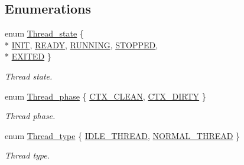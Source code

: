 \subsection*{Enumerations}
\begin{DoxyCompactItemize}
\item 
enum \hyperlink{group__scheduler_ga6c969c169777f82c104cf73e501df70f}{Thread\-\_\-state} \{ \\*
\hyperlink{group__scheduler_gga6c969c169777f82c104cf73e501df70fa0cb1b2c6a7db1f1084886c98909a3f36}{I\-N\-I\-T}, 
\hyperlink{group__scheduler_gga6c969c169777f82c104cf73e501df70fa6564f2f3e15be06b670547bbcaaf0798}{R\-E\-A\-D\-Y}, 
\hyperlink{group__scheduler_gga6c969c169777f82c104cf73e501df70fa1061be6c3fb88d32829cba6f6b2be304}{R\-U\-N\-N\-I\-N\-G}, 
\hyperlink{group__scheduler_gga6c969c169777f82c104cf73e501df70fa948b2aee15f52b421fa4770c47bcfe8c}{S\-T\-O\-P\-P\-E\-D}, 
\\*
\hyperlink{group__scheduler_gga6c969c169777f82c104cf73e501df70fab9f9543350f6bd6191e52158daa88884}{E\-X\-I\-T\-E\-D}
 \}
\begin{DoxyCompactList}\small\item\em Thread state. \end{DoxyCompactList}\item 
enum \hyperlink{group__scheduler_gab180b4aa356776bddcd724cef4f5deae}{Thread\-\_\-phase} \{ \hyperlink{group__scheduler_ggab180b4aa356776bddcd724cef4f5deaeaa826daca588e692c88114586b0de472b}{C\-T\-X\-\_\-\-C\-L\-E\-A\-N}, 
\hyperlink{group__scheduler_ggab180b4aa356776bddcd724cef4f5deaea2b4b41fda67c1a83e6523675515c007b}{C\-T\-X\-\_\-\-D\-I\-R\-T\-Y}
 \}
\begin{DoxyCompactList}\small\item\em Thread phase. \end{DoxyCompactList}\item 
enum \hyperlink{group__scheduler_ga18795bc1ab00161fc27ce34b1895fb03}{Thread\-\_\-type} \{ \hyperlink{group__scheduler_gga18795bc1ab00161fc27ce34b1895fb03abc11b4e4eba50c875d7ed6bc34090dd3}{I\-D\-L\-E\-\_\-\-T\-H\-R\-E\-A\-D}, 
\hyperlink{group__scheduler_gga18795bc1ab00161fc27ce34b1895fb03a1d3bb8be1deb6ac7be94fea88e1ed76b}{N\-O\-R\-M\-A\-L\-\_\-\-T\-H\-R\-E\-A\-D}
 \}
\begin{DoxyCompactList}\small\item\em Thread type. \end{DoxyCompactList}\end{DoxyCompactItemize}
